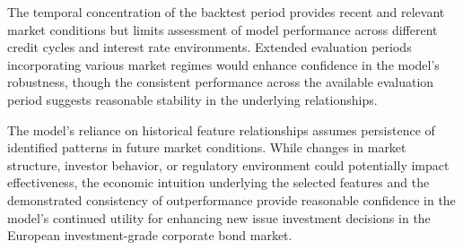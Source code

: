 The temporal concentration of the backtest period provides recent and relevant market conditions but limits assessment of model performance across different credit cycles and interest rate environments. Extended evaluation periods incorporating various market regimes would enhance confidence in the model's robustness, though the consistent performance across the available evaluation period suggests reasonable stability in the underlying relationships.

The model's reliance on historical feature relationships assumes persistence of identified patterns in future market conditions. While changes in market structure, investor behavior, or regulatory environment could potentially impact effectiveness, the economic intuition underlying the selected features and the demonstrated consistency of outperformance provide reasonable confidence in the model's continued utility for enhancing new issue investment decisions in the European investment-grade corporate bond market.